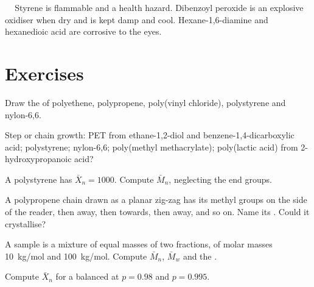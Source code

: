 \begin{safety}{\,\,\,\,\,}
Styrene is flammable and a health hazard. Dibenzoyl peroxide is an explosive oxidiser when dry and is
kept damp and cool. Hexane-1,6-diamine and hexanedioic acid are corrosive to the eyes.
\end{safety}

\section{Exercises}

\begin{exercise}[$\star$]\label{exo:b2:polymer-synthesis:1}
Draw the  of polyethene, polypropene, poly(vinyl chloride), polystyrene and nylon-6,6.
\end{exercise}

\begin{exercise}[$\star$]\label{exo:b2:polymer-synthesis:2}
Step or chain growth: PET from ethane-1,2-diol and benzene-1,4-dicarboxylic acid; polystyrene;
nylon-6,6; poly(methyl methacrylate); poly(lactic acid) from 2-hydroxypropanoic acid?
\end{exercise}

\begin{exercise}[$\star$]\label{exo:b2:polymer-synthesis:3}
A polystyrene has $\bar X_n = 1000$. Compute $\bar M_n$, neglecting the end groups.
\end{exercise}

\begin{exercise}[$\star$]\label{exo:b2:polymer-synthesis:4}
A polypropene chain drawn as a planar zig-zag has its methyl groups on the side of the reader, then
away, then towards, then away, and so on. Name its . Could it crystallise?
\end{exercise}

\begin{exercise}[$\star\star$]\label{exo:b2:polymer-synthesis:5}
A sample is a mixture of equal masses of two fractions, of molar masses \qty{10}{kg/mol} and
\qty{100}{kg/mol}. Compute $\bar M_n$, $\bar M_w$ and the .
\end{exercise}

\begin{exercise}[$\star\star$]\label{exo:b2:polymer-synthesis:6}
Compute $\bar X_n$ for a balanced  at $p = 0.98$ and $p = 0.995$.
\end{exercise}

